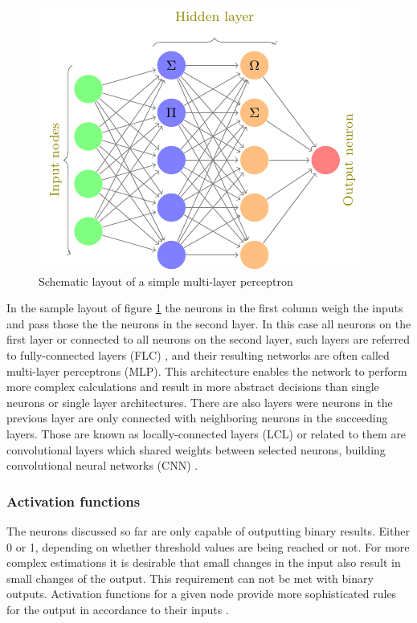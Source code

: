 \begin{figure}[H]
\centering
\includegraphics[height=.25\textheight, width=.5\textwidth]{Figures/neuralnet}
\decoRule
\caption[Schematic layout of a simple multi-layer perceptron]{Schematic layout of a simple multi-layer perceptron}
\label{fig:nn}
\end{figure}

In the sample layout of figure \ref{fig:nn} the neurons in the first column weigh the inputs and pass those
the the neurons in the second layer. In this case all neurons on the first layer or connected to all neurons
on the second layer, such layers are referred to fully-connected layers (FLC) , and their resulting networks
are often called multi-layer perceptrons (MLP). This architecture enables the network to perform more complex
calculations and result in more abstract decisions than single neurons or single layer architectures. There
are also layers were neurons in the previous layer are only connected with neighboring neurons in the
succeeding layers. Those are known as locally-connected layers (LCL) or related to them are convolutional
layers which shared weights between selected neurons, building convolutional neural networks (CNN) \cite{lecun1999object} .

\subsubsection{Activation functions}

The neurons discussed so far are only capable of outputting binary results. Either 0 or 1, depending on
whether threshold values are being reached or not. For more complex estimations it is desirable that small
changes in the input also result in small changes of the output. This requirement can not be met with binary
outputs. Activation functions for a given node provide more sophisticated rules for the output in accordance
to their inputs \cite{vzilinskas2006practical}.

